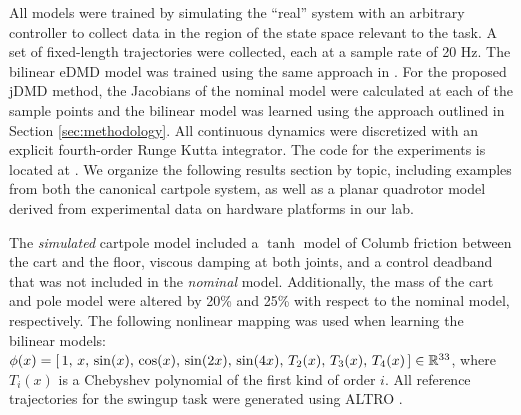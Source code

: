 \documentclass{article}
\begin{document}
All models were trained by simulating the ``real'' system with an arbitrary controller to 
collect data in the region of the state space relevant to the task. A set of fixed-length 
trajectories were collected, each at a sample rate of 20 Hz. The bilinear eDMD model was
trained using the same approach in \cite{Folkestad2021}. For the proposed jDMD method, the
Jacobians of the nominal model were calculated at each of the sample points and the bilinear
model was learned using the approach outlined in Section \ref{sec:methodology}.
All continuous dynamics were discretized with an explicit fourth-order Runge Kutta 
integrator. The code for the experiments is located at .
We organize the following results section by topic, including examples from both the 
canonical cartpole system, as well as a planar quadrotor model derived from experimental 
data on hardware platforms in our lab.


The \textit{simulated} cartpole model included a $\tanh$ model of Columb friction between
the cart and the floor, viscous damping at both joints, and a control deadband that was not
included in the \textit{nominal} model. Additionally, the mass of the cart and pole model
were altered by 20\% and 25\% with respect to the nominal model, respectively.  The
following nonlinear mapping was used when learning the bilinear models: $\phi(x) = [\, 1,\,
x,\, \sin(x),\, \cos(x),\, \sin(2x),\, \sin(4x),\, T_2(x),\, T_3(x),\, T_4(x)\, ] \in
\mathbb{R}^{33}$, where $T_i(x)$ is a Chebyshev polynomial of the first kind of order $i$. 
All reference trajectories for the swingup task were generated using ALTRO 
\cite{Howell2019,Jackson2021}.

  
\end{document}
